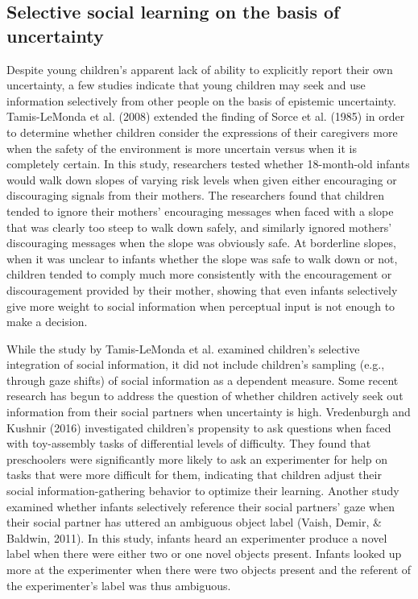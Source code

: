 \documentclass[floatsintext,man]{apa6}
\theoremstyle{definition}
\theoremstyle{definition}
\theoremstyle{definition}
\theoremstyle{remark}
\begin{document}
\subsection{Selective social learning on the basis of
uncertainty}\label{selective-social-learning-on-the-basis-of-uncertainty}

Despite young children's apparent lack of ability to explicitly report
their own uncertainty, a few studies indicate that young children may
seek and use information selectively from other people on the basis of
epistemic uncertainty. Tamis-LeMonda et al. (2008) extended the finding
of Sorce et al. (1985) in order to determine whether children consider
the expressions of their caregivers more when the safety of the
environment is more uncertain versus when it is completely certain. In
this study, researchers tested whether 18-month-old infants would walk
down slopes of varying risk levels when given either encouraging or
discouraging signals from their mothers. The researchers found that
children tended to ignore their mothers' encouraging messages when faced
with a slope that was clearly too steep to walk down safely, and
similarly ignored mothers' discouraging messages when the slope was
obviously safe. At borderline slopes, when it was unclear to infants
whether the slope was safe to walk down or not, children tended to
comply much more consistently with the encouragement or discouragement
provided by their mother, showing that even infants selectively give
more weight to social information when perceptual input is not enough to
make a decision.

While the study by Tamis-LeMonda et al. examined children's selective
integration of social information, it did not include children's
sampling (e.g., through gaze shifts) of social information as a
dependent measure. Some recent research has begun to address the
question of whether children actively seek out information from their
social partners when uncertainty is high. Vredenburgh and Kushnir (2016)
investigated children's propensity to ask questions when faced with
toy-assembly tasks of differential levels of difficulty. They found that
preschoolers were significantly more likely to ask an experimenter for
help on tasks that were more difficult for them, indicating that
children adjust their social information-gathering behavior to optimize
their learning. Another study examined whether infants selectively
reference their social partners' gaze when their social partner has
uttered an ambiguous object label (Vaish, Demir, \& Baldwin, 2011). In
this study, infants heard an experimenter produce a novel label when
there were either two or one novel objects present. Infants looked up
more at the experimenter when there were two objects present and the
referent of the experimenter's label was thus ambiguous.
\end{document}
